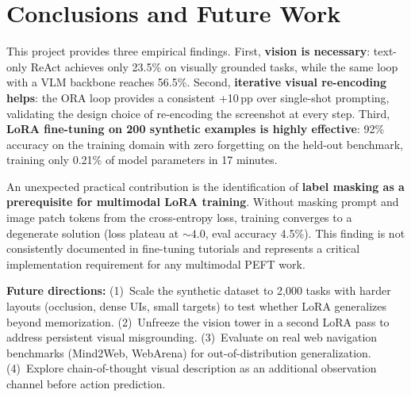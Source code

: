 \documentclass[10pt,twocolumn]{article}
\begin{document}
\section{Conclusions and Future Work}

This project provides three empirical findings. First, \textbf{vision is necessary}: text-only
ReAct achieves only 23.5\% on visually grounded tasks, while the same loop with a VLM backbone
reaches 56.5\%. Second, \textbf{iterative visual re-encoding helps}: the ORA loop provides a
consistent +10\,pp over single-shot prompting, validating the design choice of re-encoding the
screenshot at every step. Third, \textbf{LoRA fine-tuning on 200 synthetic examples is highly
effective}: 92\% accuracy on the training domain with zero forgetting on the held-out benchmark,
training only 0.21\% of model parameters in 17 minutes.

An unexpected practical contribution is the identification of \textbf{label masking as a
prerequisite for multimodal LoRA training}. Without masking prompt and image patch tokens from
the cross-entropy loss, training converges to a degenerate solution (loss plateau at ${\sim}4.0$,
eval accuracy 4.5\%). This finding is not consistently documented in fine-tuning tutorials and
represents a critical implementation requirement for any multimodal PEFT work.

\textbf{Future directions:}
(1)~Scale the synthetic dataset to 2{,}000 tasks with harder layouts (occlusion, dense UIs,
small targets) to test whether LoRA generalizes beyond memorization.
(2)~Unfreeze the vision tower in a second LoRA pass to address persistent visual misgrounding.
(3)~Evaluate on real web navigation benchmarks (Mind2Web, WebArena) for out-of-distribution
generalization.
(4)~Explore chain-of-thought visual description as an additional observation channel before
action prediction.

\end{document}
